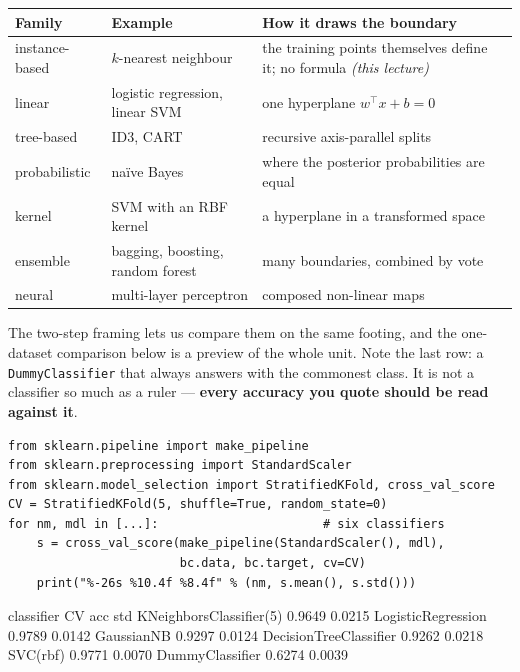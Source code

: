 \documentclass[11pt]{article}
\begin{document}
\begin{center}\small
\begin{tabular}{@{}llp{6.1cm}@{}}
\toprule
\textbf{Family} & \textbf{Example} & \textbf{How it draws the boundary}\\
\midrule
instance-based & $k$-nearest neighbour & the training points themselves
  define it; no formula \emph{(this lecture)}\\
linear & logistic regression, linear SVM & one hyperplane
  $w^{\!\top}x + b = 0$\\
tree-based & ID3, CART & recursive axis-parallel splits\\
probabilistic & na\"ive Bayes & where the posterior probabilities are equal\\
kernel & SVM with an RBF kernel & a hyperplane in a transformed space\\
ensemble & bagging, boosting, random forest & many boundaries, combined
  by vote\\
neural & multi-layer perceptron & composed non-linear maps\\
\bottomrule
\end{tabular}
\end{center}

The two-step framing lets us compare them on the same footing, and the
one-dataset comparison below is a preview of the whole unit. Note the last
row: a \texttt{DummyClassifier} that always answers with the commonest class.
It is not a classifier so much as a ruler --- \textbf{every accuracy you quote
should be read against it}.

\begin{lstlisting}
from sklearn.pipeline import make_pipeline
from sklearn.preprocessing import StandardScaler
from sklearn.model_selection import StratifiedKFold, cross_val_score
CV = StratifiedKFold(5, shuffle=True, random_state=0)
for nm, mdl in [...]:                       # six classifiers
    s = cross_val_score(make_pipeline(StandardScaler(), mdl),
                        bc.data, bc.target, cv=CV)
    print("%-26s %10.4f %8.4f" % (nm, s.mean(), s.std()))
\end{lstlisting}
\begin{codeout}
classifier                     CV acc      std
KNeighborsClassifier(5)        0.9649   0.0215
LogisticRegression             0.9789   0.0142
GaussianNB                     0.9297   0.0124
DecisionTreeClassifier         0.9262   0.0218
SVC(rbf)                       0.9771   0.0070
DummyClassifier                0.6274   0.0039
\end{codeout}
\end{document}
